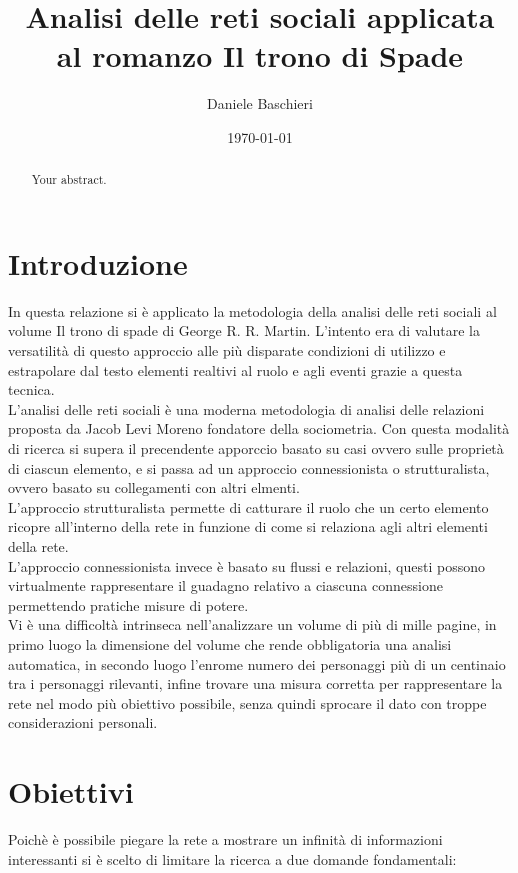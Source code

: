 \documentclass[a4paper]{article}
\title{Analisi delle reti sociali applicata al romanzo Il trono di Spade}
\author{Daniele Baschieri}
\date{\today}
\begin{document}
\maketitle

\begin{abstract}
Your abstract.
\end{abstract}

\section{Introduzione}

In questa relazione si è applicato la metodologia della analisi delle reti sociali al volume Il trono di spade di George R. R. Martin. L'intento era di valutare la versatilità di questo approccio alle più disparate condizioni di utilizzo e estrapolare dal testo elementi realtivi al ruolo e agli eventi grazie a questa tecnica.\\
L'analisi delle reti sociali è una moderna metodologia di analisi delle relazioni proposta da Jacob Levi Moreno fondatore della sociometria. 
Con questa modalità di ricerca si supera il precendente apporccio basato su casi ovvero sulle proprietà di ciascun elemento, e si passa ad un approccio connessionista o strutturalista, ovvero basato su collegamenti con altri elmenti.\\
L'approccio strutturalista permette di catturare il ruolo che un certo elemento ricopre all'interno della rete in funzione di come si relaziona agli altri elementi della rete.\\
L'approccio connessionista invece è basato su flussi e relazioni, questi possono virtualmente rappresentare il guadagno relativo a ciascuna connessione permettendo pratiche misure di potere.\\
Vi è una difficoltà intrinseca nell'analizzare un volume di più di mille pagine, in primo luogo la dimensione del volume che rende obbligatoria una analisi automatica, in secondo luogo l'enrome numero dei personaggi più di un centinaio tra i personaggi rilevanti, infine trovare una misura corretta per rappresentare la rete nel modo più obiettivo possibile, senza quindi sprocare il dato con troppe considerazioni personali.

\section{Obiettivi}

Poichè è possibile piegare la rete a mostrare un infinità di informazioni interessanti si è scelto di limitare la ricerca a due domande fondamentali:
\end{document}
